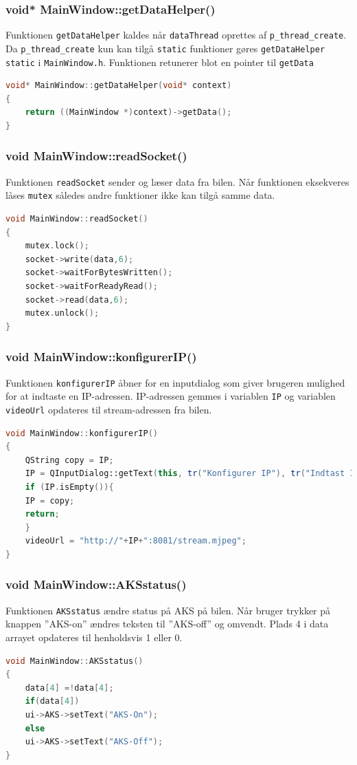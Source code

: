 \subsubsection{void* MainWindow::getDataHelper()}
Funktionen \texttt{getDataHelper} kaldes når \texttt{dataThread} oprettes af \texttt{p\_thread\_create}. Da \texttt{p\_thread\_create} kun kan tilgå \texttt{static} funktioner gøres \texttt{getDataHelper} \texttt{static} i \texttt{MainWindow.h}. Funktionen retunerer blot en pointer til \texttt{getData}
\begin{lstlisting}[caption={getDataHelper},label=lst:getData, language=c++]
void* MainWindow::getDataHelper(void* context)
{
    return ((MainWindow *)context)->getData();
}
\end{lstlisting}

\subsubsection{void MainWindow::readSocket()}
Funktionen \texttt{readSocket} sender og læser data fra bilen. Når funktionen eksekveres låses \texttt{mutex} således andre funktioner ikke kan tilgå samme data.
\begin{lstlisting}[caption={readSocket},label=lst:readSocket, language=c++]
void MainWindow::readSocket()
{   
    mutex.lock();
    socket->write(data,6);
    socket->waitForBytesWritten();
    socket->waitForReadyRead();
    socket->read(data,6);
    mutex.unlock();
}
\end{lstlisting}

\subsubsection{void MainWindow::konfigurerIP()}
Funktionen \texttt{konfigurerIP} åbner for en inputdialog som giver brugeren mulighed for at indtaste en IP-adressen. IP-adressen gemmes i variablen \texttt{IP} og variablen \texttt{videoUrl} opdateres til stream-adressen fra bilen.
\begin{lstlisting}[caption={konfigurerIP},label=lst:konfigurerIP, language=c++]
void MainWindow::konfigurerIP()
{
    QString copy = IP;
    IP = QInputDialog::getText(this, tr("Konfigurer IP"), tr("Indtast IP adressen"), QLineEdit::Normal,IP);
    if (IP.isEmpty()){
    IP = copy;
    return;
    }
    videoUrl = "http://"+IP+":8081/stream.mjpeg";
}
\end{lstlisting}

\subsubsection{void MainWindow::AKSstatus()}
Funktionen \texttt{AKSstatus} ændre status på AKS på bilen. Når bruger trykker på knappen ''AKS-on'' ændres teksten til ''AKS-off'' og omvendt. Plads 4 i data arrayet opdateres til henholdsvis 1 eller 0. 
\begin{lstlisting}[caption={AKSstatus},label=lst:AKSstatus, language=c++]
void MainWindow::AKSstatus()
{
    data[4] =!data[4];
    if(data[4])
    ui->AKS->setText("AKS-On");
    else
    ui->AKS->setText("AKS-Off");
}
\end{lstlisting}

